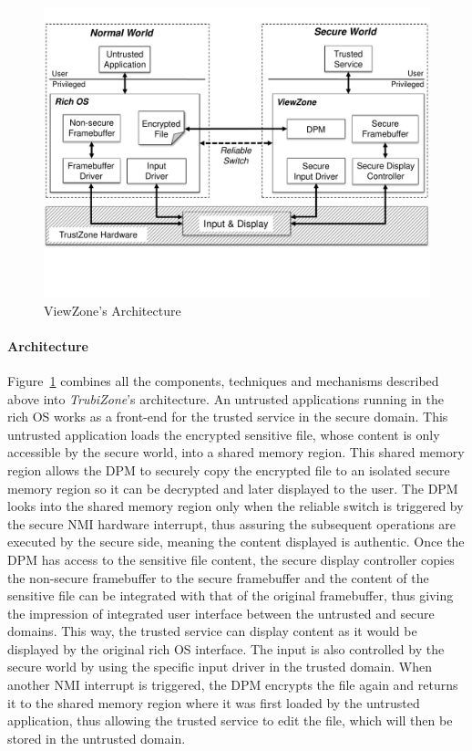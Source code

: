 
\begin{figure}[t!]
	\centering
	\includegraphics[width=1\textwidth]{img/viewzone_architecture.pdf}
	\caption{ViewZone's Architecture}
	\label{fig:viewzone_architecture}
\end{figure}

\paragraph{\textbf{Architecture}} Figure~\ref{fig:viewzone_architecture} combines all the components, techniques and mechanisms described above into \emph{TrubiZone}'s architecture. An untrusted applications running in the rich OS works as a front-end for the trusted service in the secure domain. This untrusted application loads the encrypted sensitive file, whose content is only accessible by the secure world, into a shared memory region. This shared memory region allows the \ac{DPM} to securely copy the encrypted file to an isolated secure memory region so it can be decrypted and later displayed to the user. The \ac{DPM} looks into the shared memory region only when the reliable switch is triggered by the secure \ac{NMI} hardware interrupt, thus assuring the subsequent operations are executed by the secure side, meaning the content displayed is authentic. Once the \ac{DPM} has access to the sensitive file content, the secure display controller copies the non-secure framebuffer to the secure framebuffer and the content of the sensitive file can be integrated with that of the original framebuffer, thus giving the impression of integrated user interface between the untrusted and secure domains. This way, the trusted service can display content as it would be displayed by the original rich OS interface. The input is also controlled by the secure world by using the specific input driver in the trusted domain. When another \ac{NMI} interrupt is triggered, the \ac{DPM} encrypts the file again and returns it to the shared memory region where it was first loaded by the untrusted application, thus allowing the trusted service to edit the file, which will then be stored in the untrusted domain.